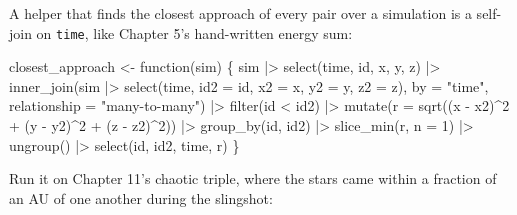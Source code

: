 \documentclass[
  10.5pt,
  letterpaper,
]{scrbook}
\newenvironment{Shaded}{\begin{snugshade}}{\end{snugshade}}
\newcommand{\AttributeTok}[1]{\textcolor[rgb]{0.00,0.00,0.00}{#1}}
\newcommand{\ControlFlowTok}[1]{\textcolor[rgb]{0.00,0.00,0.00}{#1}}
\newcommand{\DecValTok}[1]{\textcolor[rgb]{0.00,0.00,0.00}{#1}}
\newcommand{\FunctionTok}[1]{\textcolor[rgb]{0.00,0.00,0.00}{#1}}
\newcommand{\NormalTok}[1]{\textcolor[rgb]{0.00,0.00,0.00}{#1}}
\newcommand{\OtherTok}[1]{\textcolor[rgb]{0.00,0.00,0.00}{#1}}
\newcommand{\SpecialCharTok}[1]{\textcolor[rgb]{0.00,0.00,0.00}{#1}}
\newcommand{\StringTok}[1]{\textcolor[rgb]{0.00,0.00,0.00}{#1}}
\theoremstyle{definition}
\theoremstyle{plain}
\theoremstyle{remark}
\begin{document}
A helper that finds the closest approach of every pair over a simulation
is a self-join on \texttt{time}, like Chapter 5's hand-written energy
sum:

\begin{Shaded}
\begin{Highlighting}[]
\NormalTok{closest\_approach }\OtherTok{\textless{}{-}} \ControlFlowTok{function}\NormalTok{(sim) \{}
\NormalTok{  sim }\SpecialCharTok{|\textgreater{}}
    \FunctionTok{select}\NormalTok{(time, id, x, y, z) }\SpecialCharTok{|\textgreater{}}
    \FunctionTok{inner\_join}\NormalTok{(sim }\SpecialCharTok{|\textgreater{}} \FunctionTok{select}\NormalTok{(time, }\AttributeTok{id2 =}\NormalTok{ id, }\AttributeTok{x2 =}\NormalTok{ x, }\AttributeTok{y2 =}\NormalTok{ y, }\AttributeTok{z2 =}\NormalTok{ z),}
               \AttributeTok{by =} \StringTok{"time"}\NormalTok{, }\AttributeTok{relationship =} \StringTok{"many{-}to{-}many"}\NormalTok{) }\SpecialCharTok{|\textgreater{}}
    \FunctionTok{filter}\NormalTok{(id }\SpecialCharTok{\textless{}}\NormalTok{ id2) }\SpecialCharTok{|\textgreater{}}
    \FunctionTok{mutate}\NormalTok{(}\AttributeTok{r =} \FunctionTok{sqrt}\NormalTok{((x }\SpecialCharTok{{-}}\NormalTok{ x2)}\SpecialCharTok{\^{}}\DecValTok{2} \SpecialCharTok{+}\NormalTok{ (y }\SpecialCharTok{{-}}\NormalTok{ y2)}\SpecialCharTok{\^{}}\DecValTok{2} \SpecialCharTok{+}\NormalTok{ (z }\SpecialCharTok{{-}}\NormalTok{ z2)}\SpecialCharTok{\^{}}\DecValTok{2}\NormalTok{)) }\SpecialCharTok{|\textgreater{}}
    \FunctionTok{group\_by}\NormalTok{(id, id2) }\SpecialCharTok{|\textgreater{}}
    \FunctionTok{slice\_min}\NormalTok{(r, }\AttributeTok{n =} \DecValTok{1}\NormalTok{) }\SpecialCharTok{|\textgreater{}}
    \FunctionTok{ungroup}\NormalTok{() }\SpecialCharTok{|\textgreater{}}
    \FunctionTok{select}\NormalTok{(id, id2, time, r)}
\NormalTok{\}}
\end{Highlighting}
\end{Shaded}

Run it on Chapter 11's chaotic triple, where the stars came within a
fraction of an AU of one another during the slingshot:
\end{document}
